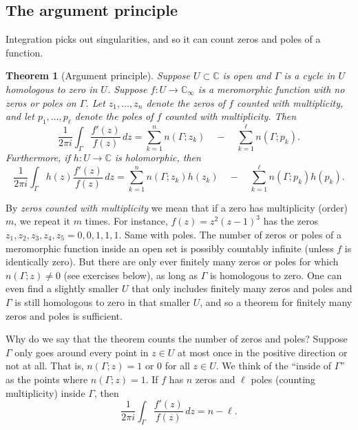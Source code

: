 \documentclass[12pt,openany]{book}
\newcommand{\C}{{\mathbb{C}}}
\newcommand{\myindex}[1]{#1\index{#1}}
\newcommand{\myquote}[1]{``#1''}
\theoremstyle{plain}
\newtheorem{thm}{Theorem}[section]
\theoremstyle{remark}
\theoremstyle{definition}
\theoremstyle{exercise}
\theoremstyle{example}
\begin{document}
\subsection{The argument principle}

Integration picks out singularities, and so it can count zeros and
poles of a function.

\begin{thm}[Argument principle]\label{thm:argprinc}
\pagebreak[2]
Suppose $U \subset \C$ is open and $\Gamma$ is a cycle in $U$
homologous to zero in $U$.
Suppose $f \colon U \to \C_\infty$ is a meromorphic function with no zeros
or poles on $\Gamma$.
Let 
$z_1,\ldots,z_n$ denote the 
zeros of $f$ counted with multiplicity,
and let $p_1,\ldots,p_\ell$ denote the poles of $f$ counted with multiplicity.
Then
\begin{equation*}
\frac{1}{2\pi i}
\int_\Gamma \frac{f'(z)}{f(z)} \, dz
=
\sum_{k=1}^n n(\Gamma;z_k)
\quad
-
\quad
\sum_{k=1}^\ell n(\Gamma;p_k) .
\end{equation*}
Furthermore, if $h \colon U \to \C$ is holomorphic, then
\begin{equation*}
\frac{1}{2\pi i}
\int_\Gamma h(z) \frac{f'(z)}{f(z)} \, dz
=
\sum_{k=1}^n n(\Gamma;z_k)h(z_k) 
\quad
-
\quad
\sum_{k=1}^\ell n(\Gamma;p_k)h(p_k) .
\end{equation*}
\end{thm}

By
\emph{\myindex{zeros counted with multiplicity}}
we mean that if
a zero has multiplicity (order) $m$, we repeat it $m$ times.
For instance, $f(z) = z^2{(z-1)}^3$ has the zeros $z_1,z_2,z_3,z_4,z_5 = 0,0,1,1,1$.
Same with poles.
The number of zeros or poles of a meromorphic function
inside an open set is possibly countably
infinite (unless $f$ is identically zero).
But there are only ever finitely
many zeros or poles for which 
$n(\Gamma;z) \not= 0$ (see exercises below), as long as $\Gamma$ is
homologous to zero.  One can even find a slightly smaller $U$ that only
includes finitely many zeros and poles and $\Gamma$ is still homologous to
zero in that smaller $U$, and so a theorem for finitely many zeros and poles is
sufficient.

Why do we say that the theorem counts the number of zeros and poles?
Suppose $\Gamma$ only goes around every point in $z \in U$ at most once
in the positive direction or not at all.  That is,
$n(\Gamma;z) = 1$ or $0$ for all $z \in U$.  We think of the
\myquote{inside of $\Gamma$} as the points where $n(\Gamma;z)=1$.
If $f$ has $n$ zeros and $\ell$ poles (counting multiplicity)
inside $\Gamma$, then
\begin{equation*}
\frac{1}{2\pi i}
\int_\Gamma \frac{f'(z)}{f(z)} \, dz
= n - \ell .
\end{equation*}
\end{document}

